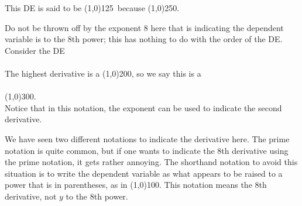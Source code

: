 \documentclass[12pt]{article}
\newcommand{\<}{\langle}
\renewcommand{\>}{\rangle}
\begin{document}
\noindent This DE is said to be %
\line(1,0){125}\, because 
\line(1,0){250}.

\noindent Do not be thrown off by the exponent 8 here that is indicating the dependent variable is to the
8th power; this has nothing to do with the order of the DE.\\

  Consider the DE\\ \\

\noindent The highest derivative is a %
\line(1,0){200}, so we say this is a \\ \\%
\line(1,0){300}.  \\
Notice that in this notation, the exponent can be used to indicate the second derivative.\\ \vspace{0.5cm}


\noindent  We have seen two different notations to indicate the derivative here. The prime notation is
quite common, but if one wants to indicate the 8th derivative using the prime notation, it gets rather
annoying.  The shorthand notation to avoid this situation is to write the dependent variable 
as what appears to be raised to a power that is in parentheses, as in %
\line(1,0){100}. This notation means
the 8th derivative, not $y$ to the 8th power.\\
\end{document}
